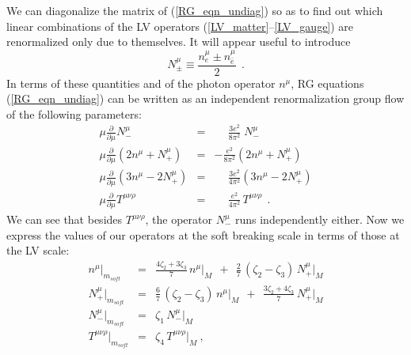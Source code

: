 \documentclass[a4paper,12pt]{article}
\begin{document}
	We can diagonalize the matrix of
(\ref{RG_eqn_undiag})
	so as to find out which linear combinations of the LV
	operators (\ref{LV_matter}--\ref{LV_gauge}) are
	renormalized only due to themselves.
	It will appear useful to introduce
\begin{equation}
\label{def_Nmu}
      N^\mu_\pm \equiv \frac{ n_e^\mu \pm n_{\bar{e}}^\mu }{2}~~.
\end{equation}
	In terms of these quantities and of the photon operator
	$ n^\mu $, RG equations (\ref{RG_eqn_undiag}) can be
	written as an independent renormalization group flow of 
	the following
	parameters:
\begin{eqnarray}
\nonumber
     \mu \frac{\partial}
              {\partial\mu} 
              N_-^\mu & = & \phantom{-} \frac{3e^2}
                                {8\pi^2} \; N_-^\mu \\
\label{RG_eqn_diag}
     \mu \frac{\partial}
              {\partial\mu}
           \left( 2 n^\mu + N_+^\mu \right ) & = &
                 - \frac{e^2}
                        {8\pi^2} 
	   \left( 2 n^\mu + N_+^\mu \right )  \\
\nonumber
     \mu \frac{\partial}
              {\partial\mu}
	   \left( 3 n^\mu - 2 N_+^\mu \right ) & = & \phantom{-} 
                  \frac{3e^2}
                       {4\pi^2} 
	   \left( 3 n^\mu - 2 N_+^\mu \right ) \\
\nonumber
     \mu \frac{\partial}
              {\partial\mu}
		T^{\mu\nu\rho} & = & 
			\phantom{-} 
	                  \frac{e^2}
        	               {4\pi^2}\, 
			T^{\mu\nu\rho}
	~~.
\end{eqnarray}
	We can see that besides $ T^{\mu\nu\rho} $, the operator
	$ N_-^\mu $ runs independently either.
	Now we express the values of our operators at the
	soft breaking scale in terms of those at the LV scale:
\begin{eqnarray}
\nonumber
	n^\mu \Bigr|_{m_{soft}} & = & 
	\frac{4\zeta_2 + 3\zeta_3}
	           {7}              \, n^\mu \Bigr|_M
	~~+~~
	\frac{2}{7}\, 
	\left( \zeta_2 - \zeta_3 \right)\, N_+^\mu \Bigr|_M \\
\label{LV_at_soft_scale}
	N_+^\mu \Bigr|_{m_{soft}} & = & 
	\frac{6}{7}\,
	\left( \zeta_2 - \zeta_3 \right)\, n^\mu \Bigr|_M
	~~+~~
	\frac{3\zeta_2 + 4\zeta_3}
                    {7}           \,  N_+^\mu \Bigr|_M \\
\nonumber
	N_-^\mu \Bigr|_{m_{soft}} & = & 
	\zeta_1\, N_-^\mu \Bigr|_M \\
\nonumber
	T^{\mu\nu\rho} \Bigr|_{m_{soft}} & = & 
	\zeta_4\, T^{\mu\nu\rho}\Bigr|_M~,
\end{eqnarray}
\end{document}
